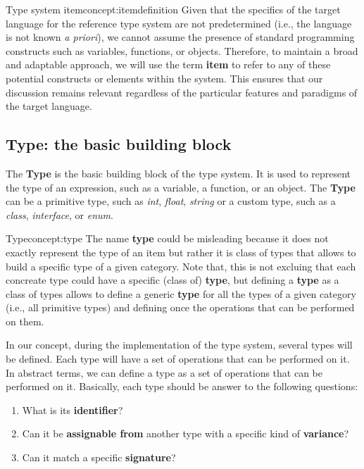 \begin{mydefinition}{Type system item}{concept:itemdefinition}
    Given that the specifics of the target language for the reference type system are not predetermined (i.e., the language is not known \textit{a priori}), we cannot assume the presence of standard programming constructs such as variables, functions, or objects. Therefore, to maintain a broad and adaptable approach, we will use the term \textbf{item} to refer to any of these potential constructs or elements within the system. This ensures that our discussion remains relevant regardless of the particular features and paradigms of the target language.
\end{mydefinition}

\subsection{Type: the basic building block}\label{subsec:concept:TypeTheBasicBuildingBlock}

The \textbf{Type} is the basic building block of the type system. It is used to represent the type of an expression, such as a variable, a function, or an object. The \textbf{Type} can be a primitive type, such as \textit{int}, \textit{float}, \textit{string} or a custom type, such as a \textit{class}, \textit{interface}, or \textit{enum}.

\begin{mydefinition}{Type}{concept:type}
The name \textbf{type} could be misleading because it does not exactly represent the type of an item but rather it is class of types that allows to build a specific type of a given category. Note that, this is not excluing that each concreate type could have a specific (class of) \textbf{type}, but defining a \textbf{type} as a class of types allows to define a generic \textbf{type} for all the types of a given category (i.e., all primitive types) and defining once the operations that can be performed on them.
\end{mydefinition}

In our concept, during the implementation of the type system, several types will be defined. Each type will have a set of operations that can be performed on it. In abstract terms, we can define a type as a set of operations that can be performed on it.
Basically, each type should be answer to the following questions:
\begin{enumerate}
    \item What is its \textbf{identifier}?
    \item Can it be \textbf{assignable from} another type with a specific kind of \textbf{variance}?
    \item Can it match a specific \textbf{signature}?
\end{enumerate}

